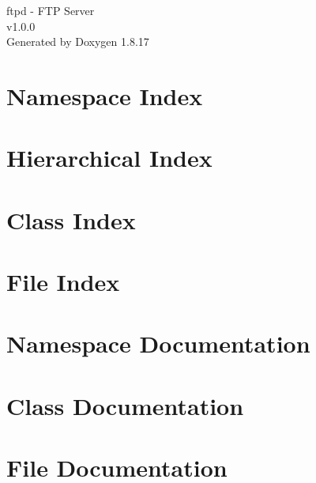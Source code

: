 \let\mypdfximage\pdfximage\def\pdfximage{\immediate\mypdfximage}\documentclass[twoside]{book}
\newcommand{\+}{\discretionary{\mbox{\scriptsize$\hookleftarrow$}}{}{}}
\newcommand{\clearemptydoublepage}{%
  \newpage{\pagestyle{empty}\cleardoublepage}%
}
\begin{document}
\hypersetup{pageanchor=false,
             bookmarksnumbered=true,
             pdfencoding=unicode
            }
\begin{titlepage}
\vspace*{7cm}
\begin{center}%
{\Large ftpd -\/ F\+TP Server \\[1ex]\large v1.\+0.\+0 }\\
\vspace*{1cm}
{\large Generated by Doxygen 1.8.17}\\
\end{center}
\end{titlepage}
\clearemptydoublepage
{}
\tableofcontents
\clearemptydoublepage
{}
\hypersetup{pageanchor=true}

\chapter{Namespace Index}

\chapter{Hierarchical Index}

\chapter{Class Index}

\chapter{File Index}

\chapter{Namespace Documentation}

\chapter{Class Documentation}





\chapter{File Documentation}











\backmatter
\newpage
{}
\clearemptydoublepage
{}
\printindex
\end{document}
